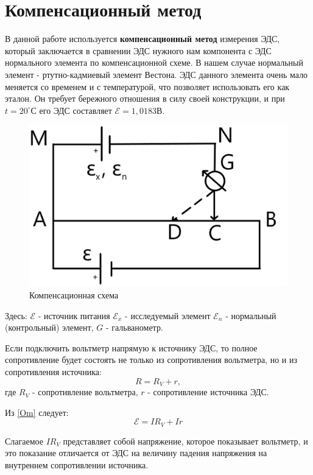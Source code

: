 \documentclass[a4paper,12pt]{article}
\begin{document}
\section{Компенсационный метод}
В данной работе используется \textbf{компенсационный метод} измерения ЭДС, который заключается в сравнении ЭДС нужного нам компонента с ЭДС нормального элемента по компенсационной схеме. В нашем случае нормальный элемент - ртутно-кадмиевый элемент Вестона. ЭДС данного элемента очень мало меняется со временем и с температурой, что позволяет использовать его как эталон. Он требует бережного отношения в силу своей конструкции, и при $t = 20^{\circ}С$ его ЭДС составляет $\mathcal{E} = 1,0183 В$.

\begin{figure}[!h]
	\begin{center}
		\includegraphics[scale=0.3]{scheme-1}
	\end{center}
	\caption{Компенсационная схема}
\end{figure}

Здесь: $\mathcal{E}$ - источник питания $\mathcal{E}_x$ - исследуемый элемент $\mathcal{E}_n$ - нормальный (контрольный) элемент, $G$ - гальванометр.  

Если подключить вольтметр напрямую к источнику ЭДС, то полное сопротивление будет состоять не только из сопротивления вольтметра, но и из сопротивления источника:
$$R = R_V + r,$$
где $R_V$ - сопротивление вольтметра, $r$ - сопротивление источника ЭДС.

Из \eqref{Om} следует:
\begin{equation}
	\mathcal{E} = IR_V + Ir
\end{equation}

Слагаемое $IR_V$ представляет собой напряжение, которое показывает вольтметр, и это показание отличается от ЭДС на величину падения напряжения на внутреннем сопротивлении источника.
\end{document}
